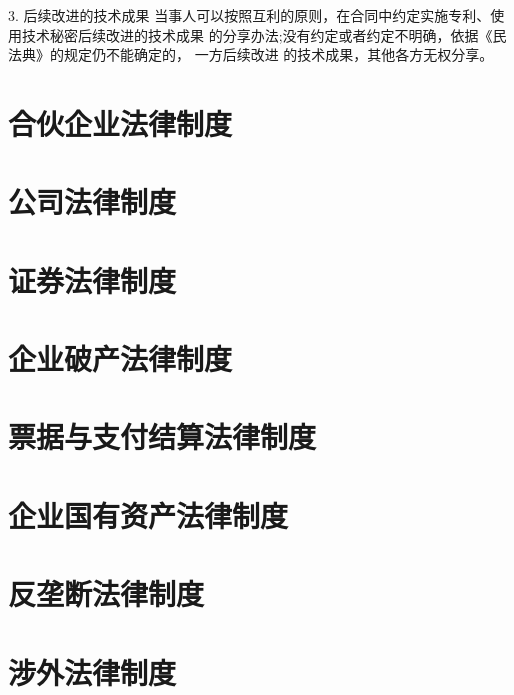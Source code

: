 \documentclass[UTF8,12pt]{ctexart}
\numberwithin{equation}{section} %
\numberwithin{figure}{section}
\numberwithin{table}{section}
\begin{document}
	3. 后续改进的技术成果 当事人可以按照互利的原则，在合同中约定实施专利、使用技术秘密后续改进的技术成果 的分享办法;没有约定或者约定不明确，依据《民法典》的规定仍不能确定的， 一方后续改进 的技术成果，其他各方无权分享。

	
	\newpage
	\section{合伙企业法律制度}
	
	
	
	\newpage
	\section{公司法律制度}
	
	
	\newpage
	\section{证券法律制度}
	
	\section{企业破产法律制度}
	
	\section{票据与支付结算法律制度}
	
	\section{企业国有资产法律制度}
	
	\section{反垄断法律制度}
	
	\section{涉外法律制度}
	
\end{document}
